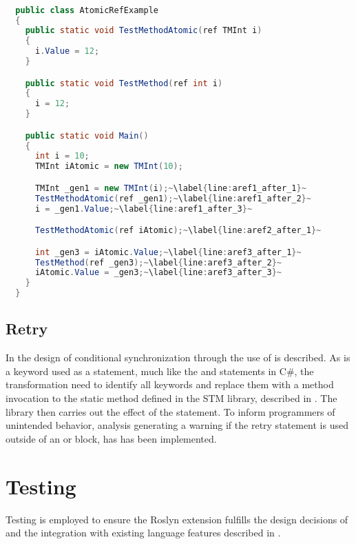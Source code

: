 \begin{lstlisting}[label=lst:after_atomic_ref,
  caption={\bscode{ref} Arguments After Transformation},
  language=Java,  
  showspaces=false,
  showtabs=false,
  breaklines=true,
  showstringspaces=false,
  breakatwhitespace=true,
  escapechar=~,
  commentstyle=\color{greencomments},
  keywordstyle=\color{bluekeywords},
  stringstyle=\color{redstrings},
  morekeywords={atomic, retry, orelse, var, get, set, ref, out}]  % Start your code-block

  public class AtomicRefExample
  {
    public static void TestMethodAtomic(ref TMInt i)
    {
      i.Value = 12;
    }

    public static void TestMethod(ref int i)
    {
      i = 12;
    }

    public static void Main()
    {
      int i = 10;
      TMInt iAtomic = new TMInt(10);

      TMInt _gen1 = new TMInt(i);~\label{line:aref1_after_1}~
      TestMethodAtomic(ref _gen1);~\label{line:aref1_after_2}~
      i = _gen1.Value;~\label{line:aref1_after_3}~

      TestMethodAtomic(ref iAtomic);~\label{line:aref2_after_1}~

      int _gen3 = iAtomic.Value;~\label{line:aref3_after_1}~
      TestMethod(ref _gen3);~\label{line:aref3_after_2}~
      iAtomic.Value = _gen3;~\label{line:aref3_after_3}~
    }
  }
\end{lstlisting}

\subsection{Retry}
In  the design of conditional synchronization through the use of  is described. As  is a keyword used as a statement, much like the  and  statements in C\#, the transformation need to identify all  keywords and replace them with a method invocation to the static method  defined in the \ac{STM} library, described in . The library then carries out the effect of the  statement. To inform programmers of unintended behavior, analysis generating a warning if the retry statement is used outside of an  or  block, has has been implemented. 

\section{Testing}
Testing is employed to ensure the Roslyn extension fulfills the design decisions of \stmnamesp and the integration with existing language features described in .


